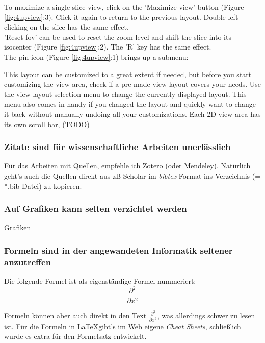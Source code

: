 \noindent
To maximize a single slice view, click on the 'Maximize view' button (Figure \ref{fig:4upview}:3). Click it again to return to the previous layout. Double left-clicking on the slice has the same effect.\\

\noindent
'Reset \gls{fov}' can be used to reset the zoom level and shift the slice into its isocenter (Figure \ref{fig:4upview}:2). The 'R' key has the same effect.\\

\noindent
The pin icon (Figure \ref{fig:4upview}:1) brings up a submenu:

\noindent
This layout can be customized to a great extent if needed, but before you start customizing the view area, check if a pre-made view layout covers your needs.
Use the view layout selection menu to change the currently displayed layout. This menu also comes in handy if you changed the layout and quickly want to change it back without manually undoing all your customizations.
Each 2D view area has its own scroll bar, (TODO)

\subsubsection{Zitate sind für wissenschaftliche Arbeiten unerlässlich}

Für das Arbeiten mit Quellen, empfehle ich Zotero (oder Mendeley).
Natürlich geht's auch die Quellen direkt aus zB Scholar im \textit{bibtex} Format ins Verzeichnis (= *.bib-Datei) zu kopieren.

\subsubsection{Auf Grafiken kann selten verzichtet werden}
Grafiken

\subsubsection{Formeln sind in der angewandeten Informatik seltener anzutreffen}
Die folgende Formel ist als eigenständige Formel nummeriert:
\begin{equation}
	\frac{\partial^2 }{\partial x^2}  %
\end{equation}

Formeln können aber auch direkt in den Text $\frac{\partial^2 }{\partial x^2}$, was allerdings schwer zu lesen ist.
Für die Formeln in \LaTeX gibt's im Web eigene \textit{Cheat Sheets}, schließlich wurde es extra für den Formelsatz entwickelt.


